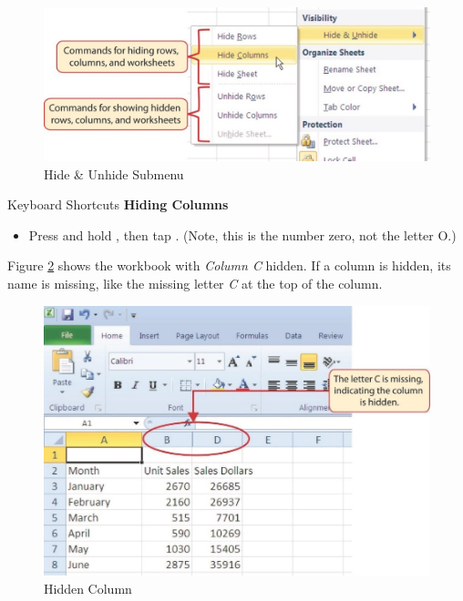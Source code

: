 \begin{figure}[H]
	\centering
	\includegraphics[width=\maxwidth{.95\linewidth}]{gfx/ch01_fig26}
	\caption{Hide \& Unhide Submenu}
	\label{01:fig26}
\end{figure}

\begin{center}
	\begin{shtcutbox}{Keyboard Shortcuts}
		\textbf{Hiding Columns}
		\\
		\begin{itemize}
			\setlength{\itemsep}{0pt}
			\setlength{\parskip}{0pt}
			\setlength{\parsep}{0pt}
			
			\item Press and hold , then tap . (Note, this is the number zero, not the letter O.)
			
		\end{itemize}
	\end{shtcutbox}
\end{center}

Figure \ref{01:fig27} shows the workbook with \textit{Column C} hidden. If a column is hidden, its name is missing, like the missing letter \textit{C} at the top of the column.

\begin{figure}[H]
	\centering
	\includegraphics[width=\maxwidth{.95\linewidth}]{gfx/ch01_fig27}
	\caption{Hidden Column}
	\label{01:fig27}
\end{figure}


